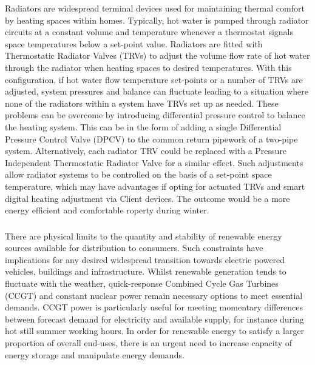 \documentclass[11pt, oneside]{book}   	%
\begin{document}
Radiators are widespread terminal devices used for maintaining thermal comfort by heating spaces within homes.
Typically, hot water is pumped through radiator circuits at a constant volume and temperature whenever a thermostat signals space temperatures below a set-point value.
Radiators are fitted with Thermostatic Radiator Valves (TRVs) to adjust the volume flow rate of hot water through the radiator when heating spaces to desired temperatures.
With this configuration, if hot water flow temperature set-points or a number of TRVs are adjusted, system pressures and balance can fluctuate leading to a situation where none of the radiators within a system have TRVs set up as needed.
These problems can be overcome by introducing differential pressure control to balance the heating system.
This can be in the form of adding a single Differential Pressure Control Valve (DPCV) to the common return pipework of a two-pipe system.
Alternatively, each radiator TRV could be replaced with a Pressure Independent Thermostatic Radiator Valve for a similar effect.
Such adjustments allow radiator systems to be controlled on the basis of a set-point space temperature, which may have advantages if opting for actuated TRVs and smart digital heating adjustment via Client devices.
The outcome would be a more energy efficient and comfortable roperty during winter.\

\subsubsection{\color{YellowOrange}{P2: Availability of Delivered Electricity}}
There are physical limits to the quantity and stability of renewable energy sources available for distribution to consumers.
Such constraints have implications for any desired widespread transition towards electric powered vehicles, buildings and infrastructure.
Whilst renewable generation tends to fluctuate with the weather, quick-response Combined Cycle Gas Turbines (CCGT) and constant nuclear power remain necessary options to meet essential demands.
CCGT power is particularly useful for meeting momentary differences between forecast demand for electricity and available supply, for instance during hot still summer working hours.
In order for renewable energy to satisfy a larger proportion of overall end-uses, there is an urgent need to increase capacity of energy storage and manipulate energy demands.\
\end{document}
